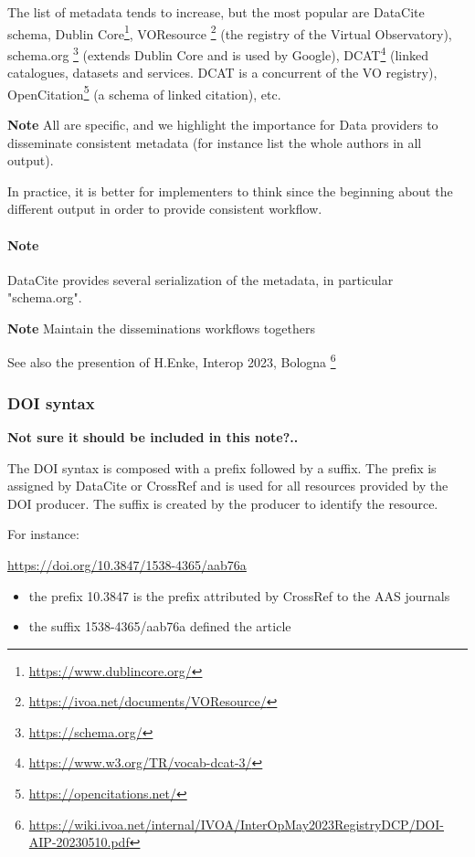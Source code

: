 \documentclass[11pt,a4paper]{ivoa}
\newcommand{\important}[1]{
	\begin{bigdescription}
		\item \color{ivoacolor}\textbf{Note} #1
	\end{bigdescription}
}
\begin{document}
The list of metadata tends to increase, but the most popular are DataCite schema, Dublin Core\footnote{\url{https://www.dublincore.org/}}, VOResource \footnote{\url{https://ivoa.net/documents/VOResource/}} (the registry of the Virtual Observatory), schema.org \footnote{\url{https://schema.org/}} (extends Dublin Core and is used by Google), DCAT\footnote{\url{https://www.w3.org/TR/vocab-dcat-3/}} (linked catalogues, datasets and services. DCAT is a concurrent of the VO registry), OpenCitation\footnote{\url{https://opencitations.net/}} (a schema of linked citation),  etc.

\important{
All are specific, and we highlight the importance for Data providers to disseminate consistent metadata
(for instance list the whole authors in all output).
}

In practice, it is better for implementers to think since the beginning about the different output in order to provide consistent workflow.

\paragraph{Note} DataCite provides several serialization of the metadata, in particular "schema.org".

\important{
Maintain the disseminations workflows togethers
}

See also the presention of H.Enke, Interop 2023, Bologna \footnote{\url{https://wiki.ivoa.net/internal/IVOA/InterOpMay2023RegistryDCP/DOI-AIP-20230510.pdf}}


\subsubsection{DOI syntax}
\textbf{\color{red} Not sure it should be included in this note?..}

The DOI syntax is composed with a prefix followed by a suffix.
The prefix is assigned by DataCite or CrossRef and is used for all resources provided by the DOI producer. The suffix is created by the producer to identify the resource.

For instance: 

\url{https://doi.org/10.3847/1538-4365/aab76a}

\begin{itemize}
	\item the prefix 10.3847 is the prefix attributed by CrossRef to the AAS journals 
	\item the suffix 1538-4365/aab76a defined the article 
\end{itemize}
\end{document}
